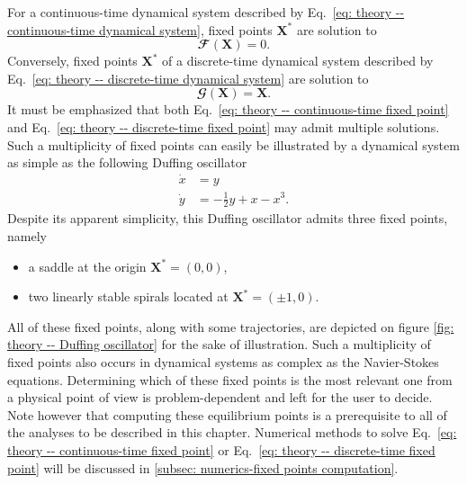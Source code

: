   For a continuous-time dynamical system described by Eq.~\eqref{eq: theory -- continuous-time dynamical system}, fixed points $\mathbf{X}^{*}$ are solution to
  \begin{equation}
    \mathbfcal{F}\left( \mathbf{X} \right) = 0.
    \label{eq: theory -- continuous-time fixed point}
  \end{equation}
  Conversely, fixed points $\mathbf{X}^*$ of a discrete-time dynamical system described by Eq.~\eqref{eq: theory -- discrete-time dynamical system} are solution to
  \begin{equation}
    \mathbfcal{G} \left( \mathbf{X} \right) = \mathbf{X}.
    \label{eq: theory -- discrete-time fixed point}
  \end{equation}
  It must be emphasized that both Eq.~\eqref{eq: theory -- continuous-time fixed point} and Eq.~\eqref{eq: theory -- discrete-time fixed point} may admit multiple solutions. Such a multiplicity of fixed points can easily be illustrated by a dynamical system as simple as the following Duffing oscillator
  \begin{equation}
    \begin{aligned}
      \dot{x} & = y \\
      \dot{y} & = -\displaystyle \frac{1}{2} y + x - x^3.
    \end{aligned}
    \label{eq: theory -- Duffing oscillator}
  \end{equation}
  Despite its apparent simplicity, this Duffing oscillator admits three fixed points, namely
  \begin{itemize}
    \item a saddle at the origin $\mathbf{X}^* = (0, 0)$,
    \item two linearly stable spirals located at $\mathbf{X}^* = (\pm 1, 0)$.
  \end{itemize}
  All of these fixed points, along with some trajectories, are depicted on figure \ref{fig: theory -- Duffing oscillator} for the sake of illustration. Such a multiplicity of fixed points also occurs in dynamical systems as complex as the Navier-Stokes equations. Determining which of these fixed points is the most relevant one from a physical point of view is problem-dependent and left for the user to decide. Note however that computing these equilibrium points is a prerequisite to all of the analyses to be described in this chapter. Numerical methods to solve Eq.~\eqref{eq: theory -- continuous-time fixed point} or Eq.~\eqref{eq: theory -- discrete-time fixed point} will be discussed in \textsection \ref{subsec: numerics-fixed points computation}.

